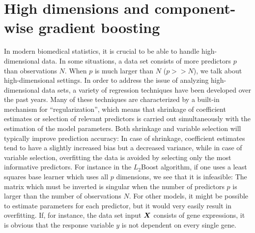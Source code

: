 \section{High dimensions and component-wise gradient boosting}\label{sec:component}
In modern biomedical statistics, it is crucial to be able to handle high-dimensional data. In some situations, a data set consists of more predictors $p$ than observations $N$. When $p$ is much larger than $N$ ($p>>N$), we talk about high-dimensional settings. In order to address the issue of analyzing high-dimensional data sets, a variety of regression techniques have been developed over the past years. Many of these techniques are characterized by a built-in mechanism for ``regularization'', which means that shrinkage of coefficient estimates or selection of relevant predictors is carried out simultaneously with the estimation of the model parameters. Both shrinkage and variable selection will typically improve prediction accuracy: In case of shrinkage, coefficient estimates tend to have a slightly increased bias but a decreased variance, while in case of variable selection, overfitting the data is avoided by selecting only the most informative predictors. For instance in the $L_2$Boost algorithm, if one uses a least squares base learner which uses all $p$ dimensions, we see that it is infeasible: The matrix which must be inverted is singular when the number of predictors $p$ is larger than the number of observations $N$. For other models, it might be possible to estimate parameters for each predictor, but it would very easily result in overfitting. If, for instance, the data set input $\bm{X}$ consists of gene expressions, it is obvious that the response variable $y$ is not dependent on every single gene.

